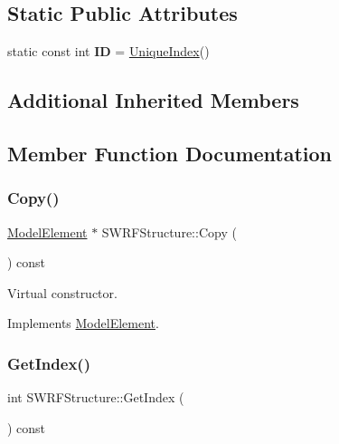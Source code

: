 \subsection*{Static Public Attributes}
\begin{DoxyCompactItemize}
\item 
\mbox{\label{classSWRFStructure_a796cc8b049fdbc64ee1af836f02a5be2}} 
static const int {\bfseries ID} = \hyperlink{classAcceleratorComponent_aa7ad4d39e1a488b705983842ed1ac784}{Unique\+Index}()
\end{DoxyCompactItemize}
\subsection*{Additional Inherited Members}


\subsection{Member Function Documentation}
\mbox{\label{classSWRFStructure_a7dac196eefbb13ccb9e5f40e2af40356}} 
\subsubsection{\texorpdfstring{Copy()}{Copy()}}
{\footnotesize\ttfamily \hyperlink{classModelElement}{Model\+Element} $\ast$ S\+W\+R\+F\+Structure\+::\+Copy (\begin{DoxyParamCaption}{ }\end{DoxyParamCaption}) const\hspace{0.3cm}{\ttfamily [virtual]}}

Virtual constructor. 

Implements \hyperlink{classModelElement_ac3ca26d649bd86a0f31a58ae09941429}{Model\+Element}.

\mbox{\label{classSWRFStructure_aad7467d215cafd843e9a8ad551307ce2}} 
\subsubsection{\texorpdfstring{Get\+Index()}{GetIndex()}}
{\footnotesize\ttfamily int S\+W\+R\+F\+Structure\+::\+Get\+Index (\begin{DoxyParamCaption}{ }\end{DoxyParamCaption}) const\hspace{0.3cm}{\ttfamily [virtual]}}

